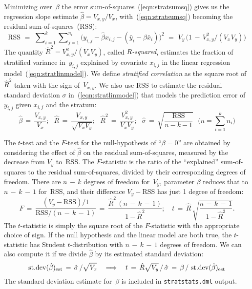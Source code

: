 Minimizing over~$\beta$ the error sum-of-squares~(\ref{eqn:stratsumsq})
gives us the regression slope estimate \mbox{$\hat{\beta} = V_{x,y} / V_x$},
with~(\ref{eqn:stratsumsq}) becoming the residual sum-of-squares~(RSS):
\begin{equation*}
\mathrm{RSS} \,\,=\, \,
\sum\nolimits_{i=1}^k \sum\nolimits_{j=1}^{n_i} \big(y_{i,j} - 
\hat{\beta} x_{i,j} - (\bar{y}_i - \hat{\beta} \bar{x}_i)\big)^2
\,\,=\,\,  V_y \,\big(1 \,-\, V_{x,y}^2 / (V_x V_y)\big)
\end{equation*}
The quantity $\hat{R}^2 = V_{x,y}^2 / (V_x V_y)$, called \emph{$R$-squared}, estimates the fraction
of stratified variance in~$y_{i,j}$ explained by covariate $x_{i, j}$ in the linear 
regression model~(\ref{eqn:stratlinmodel}).  We define \emph{stratified correlation} as the
square root of~$\hat{R}^2$ taken with the sign of~$V_{x,y}$.  We also use RSS to estimate
the residual standard deviation $\sigma$ in~(\ref{eqn:stratlinmodel}) that models the prediction error
of $y_{i,j}$ given $x_{i,j}$ and the stratum:
\begin{equation*}
\hat{\beta}\, =\, \frac{V_{x,y}}{V_x}; \,\,\,\, \hat{R} \,=\, \frac{V_{x,y}}{\sqrt{V_x V_y}};
\,\,\,\, \hat{R}^2 \,=\, \frac{V_{x,y}^2}{V_x V_y};
\,\,\,\, \hat{\sigma} \,=\, \sqrt{\frac{\mathrm{RSS}}{n - k - 1}}\,\,\,\,
\Big(n = \sum_{i=1}^k n_i\Big)
\end{equation*}

The $t$-test and the $F$-test for the null-hypothesis of ``$\beta = 0$'' are
obtained by considering the effect of $\hat{\beta}$ on the residual sum-of-squares,
measured by the decrease from $V_y$ to~RSS.
The $F$-statistic is the ratio of the ``explained'' sum-of-squares
to the residual sum-of-squares, divided by their corresponding degrees of freedom.
There are $n\,{-}\,k$ degrees of freedom for~$V_y$, parameter $\beta$ reduces that
to $n\,{-}\,k\,{-}\,1$ for~RSS, and their difference $V_y - {}$RSS has just 1 degree
of freedom:
\begin{equation*}
F \,=\, \frac{(V_y - \mathrm{RSS})/1}{\mathrm{RSS}/(n\,{-}\,k\,{-}\,1)}
\,=\, \frac{\hat{R}^2\,(n\,{-}\,k\,{-}\,1)}{1-\hat{R}^2}; \quad
t \,=\, \hat{R}\, \sqrt{\frac{n\,{-}\,k\,{-}\,1}{1-\hat{R}^2}}.
\end{equation*}
The $t$-statistic is simply the square root of the $F$-statistic with the appropriate
choice of sign.  If the null hypothesis and the linear model are both true, the $t$-statistic
has Student $t$-distribution with $n\,{-}\,k\,{-}\,1$ degrees of freedom.  We can
also compute it if we divide $\hat{\beta}$ by its estimated standard deviation:
\begin{equation*}
\mathop{\mathrm{st.dev}}\nolimits(\hat{\beta})_{\mathrm{est}} \,=\, \hat{\sigma}\,/\sqrt{V_x} \quad\Longrightarrow\quad
t \,=\, \hat{R}\sqrt{V_y} \,/\, \hat{\sigma} \,=\, \beta \,/\, \mathop{\mathrm{st.dev}}\nolimits(\hat{\beta})_{\mathrm{est}}
\end{equation*}
The standard deviation estimate for~$\beta$ is included in {\tt stratstats.dml} output.

